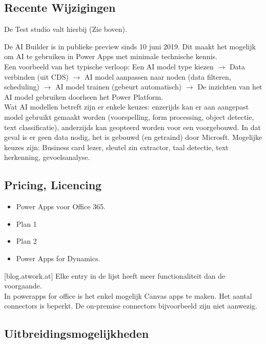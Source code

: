 \subsection{Recente Wijzigingen}

De Test studio valt hierbij (Zie boven). %

De AI Builder is in publieke preview sinds 10 juni 2019. Dit maakt het mogelijk om AI te gebruiken in Power Apps met minimale technische kennis.\\
Een voorbeeld van het typische verloop: Een AI model type kiezen $\rightarrow$ Data verbinden (uit CDS) $\rightarrow$ AI model aanpassen naar noden (data filteren, scheduling) $\rightarrow$ AI model trainen (gebeurt automatisch) $\rightarrow$ De inzichten van het AI model gebruiken doorheen het Power Platform.\\
Wat AI modellen betreft zijn er enkele keuzes: enzerijds kan er aan aangepast model gebruikt gemaakt worden (voorspelling, form processing, object detectie, text classificatie), anderzijds kan geopteerd worden voor een voorgebouwd. In dat geval is er geen data nodig, het is gebouwd (en getraind) door Microsft. Mogelijke keuzes zijn: Business card lezer, sleutel zin extractor, taal detectie, text herkenning, gevoelsanalyse.


\subsection{Pricing, Licencing}

\begin{itemize}
    \item Power Apps voor Office 365.
    \item Plan 1
    \item Plan 2
    \item Power Apps for Dynamics.
\end{itemize} [blog.atwork.at]
Elke entry in de lijst heeft meer functionaliteit dan de voorgaande.\\
In powerapps for office is het enkel mogelijk Canvas apps te maken. Het aantal connectors is beperkt. De on-premise connectors bijvoorbeeld zijn niet aanwezig.

\subsection{Uitbreidingsmogelijkheden}

